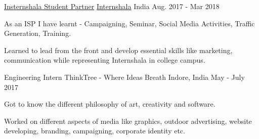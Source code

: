 \begin{cventries}
  \cventry
    {\href{https://drive.google.com/drive/folders/1fHcp1yWXWVQ38b3Fh2yb8fttpHtSpiQc?usp=sharing}{Insternshala Student Partner}} %
    {\href{https://internshala.com/}{Internshala}} %
    {India} %
    {Aug. 2017 - Mar 2018} %
    {
      \begin{cvitems} %
        \item {As an ISP I have learnt - Campaigning, Seminar, Social Media Activities, Traffic Generation, Training.}
        \item {Learned to lead from the front and develop essential skills like marketing, communication while representing Internshala in college campus. }
      \end{cvitems}
    }

  \cventry
    {Engineering Intern} %
    {ThinkTree - Where Ideas Breath} %
    {Indore, India} %
    {May - July 2017 } %
    {
      \begin{cvitems} %
        \item {Got to know the different philosophy of art, creativity and software.}
        \item {Worked on different aspects of media like graphics, outdoor advertising, website developing, branding, campaigning, corporate identity etc.}
      \end{cvitems}
    }
\end{cventries}
